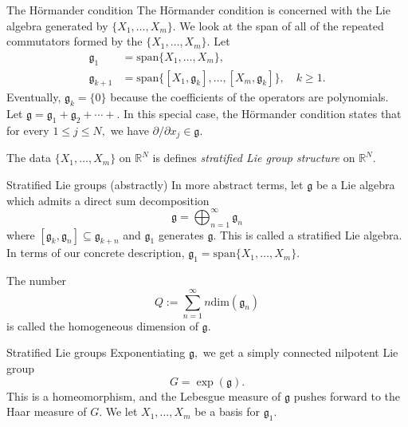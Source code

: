 \documentclass{beamer}
\numberwithin{equation}{section}
\theoremstyle{plain}
\theoremstyle{plain}
\theoremstyle{definition}
\theoremstyle{plain}
\theoremstyle{plain}
\theoremstyle{definition}
\newcommand{\Rl}{\mathbb{R}}
\newcommand{\gf}{\mathfrak{g}}
\begin{document}
\begin{frame}{The H\"{o}rmander condition}
    The H\"ormander condition is concerned with the Lie algebra generated by $\{X_1,\ldots,X_m\}.$ We look at the span
    of all of the repeated commutators formed by the $\{X_1,\ldots,X_m\}.$ Let
    \begin{align*}
      \gf_1 &= \mathrm{span}\{X_1,\ldots,X_m\},\\
      \gf_{k+1} &= \mathrm{span}\{[X_1,\gf_k],\ldots,[X_m,\gf_k]\},\quad k\geq 1.
    \end{align*}
    Eventually, $\gf_k=\{0\}$ because the coefficients of the operators are polynomials.
    Let $\gf = \gf_1+\gf_2+\cdots+.$
    In this special case, the H\"{o}rmander condition states that for every $1\leq j\leq N,$ we have  $\partial/\partial x_j\in \gf.$

    The data $\{X_1,\ldots,X_m\}$ on $\Rl^N$ is defines \emph{stratified Lie group structure} on $\Rl^N.$
\end{frame}


\begin{frame}{Stratified Lie groups (abstractly)}
  In more abstract terms, let $\gf$ be a Lie algebra which admits a direct sum decomposition
  \[
    \gf = \bigoplus_{n=1}^\infty \gf_n
  \]
  where $[\gf_k,\gf_n] \subseteq \gf_{k+n}$ and $\gf_1$ generates $\gf.$
  This is called a stratified Lie algebra. In terms of our concrete description, $\gf_1 = \mathrm{span}\{X_1,\ldots,X_m\}.$

  The number
  \[
    Q := \sum_{n=1}^\infty n\mathrm{dim}(\gf_n)
  \]
  is called the homogeneous dimension of $\gf.$
\end{frame}

\begin{frame}{Stratified Lie groups}
  Exponentiating $\gf,$ we get a simply connected nilpotent Lie group
  \[
    G = \exp(\gf).
  \]
  This is a homeomorphism, and the Lebesgue measure of $\gf$ pushes forward to the Haar measure of $G.$
  We let $X_1,\ldots,X_m$ be a basis for $\gf_1.$
\end{frame}
\end{document}
